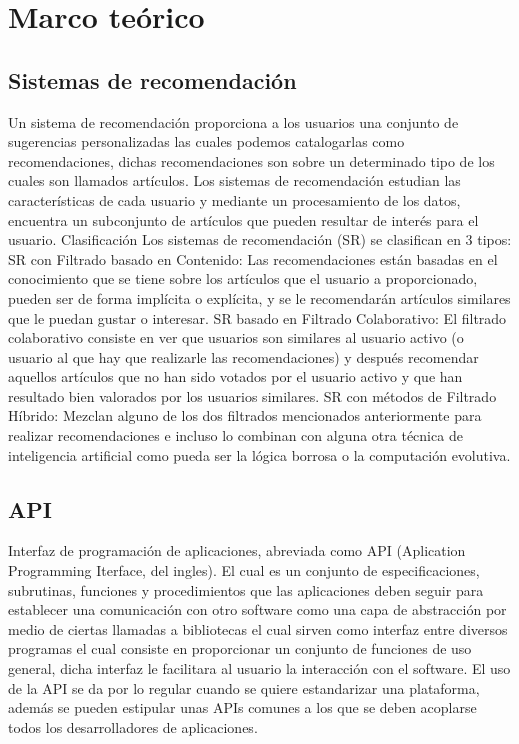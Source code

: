 \chapter {Marco teórico}
\section {Sistemas de recomendación}
  Un sistema de recomendación proporciona a los usuarios una conjunto de sugerencias personalizadas las cuales podemos catalogarlas como recomendaciones, dichas recomendaciones son sobre un determinado tipo de los cuales son llamados artículos. Los sistemas de recomendación estudian las características de cada usuario y mediante un procesamiento de los datos, encuentra un subconjunto de artículos que pueden resultar de interés para el usuario. Clasificación Los sistemas de recomendación (SR) se clasifican en 3 tipos: SR con Filtrado basado en Contenido: Las recomendaciones están basadas en el conocimiento que se tiene sobre los artículos que el usuario a proporcionado, pueden ser de forma implícita o explícita, y se le recomendarán artículos similares que le puedan gustar o interesar. SR basado en Filtrado Colaborativo: El filtrado colaborativo consiste en ver que usuarios son similares al usuario activo (o usuario al que hay que realizarle las recomendaciones) y después recomendar aquellos artículos que no han sido votados por el usuario activo y que han resultado bien valorados por los usuarios similares. SR con métodos de Filtrado Híbrido: Mezclan alguno de los dos filtrados mencionados anteriormente para realizar recomendaciones e incluso lo combinan con alguna otra técnica de inteligencia artificial como pueda ser la lógica borrosa o la computación evolutiva. \cite{10}

\section{API}
  Interfaz de programación de aplicaciones, abreviada como API (Aplication Programming Iterface, del ingles). El cual es un conjunto de especificaciones, subrutinas, funciones y procedimientos que las aplicaciones deben seguir para establecer una comunicación con otro software como una capa de abstracción por medio de ciertas llamadas a bibliotecas el cual sirven como interfaz entre diversos programas el cual consiste en proporcionar un conjunto de funciones de uso general, dicha interfaz le facilitara al usuario la interacción con el software. El uso de la API se da por lo regular cuando se quiere estandarizar una plataforma, además se pueden estipular unas APIs comunes a los que se deben acoplarse todos los desarrolladores de aplicaciones. 

